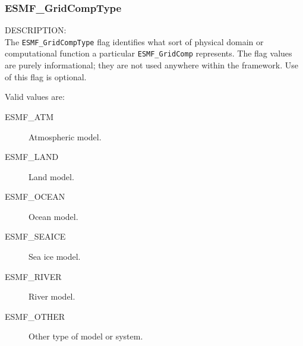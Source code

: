 
\subsubsection{ESMF\_GridCompType}
\label{opt:gridcomptype}

{\sf DESCRIPTION:\\}
The {\tt ESMF\_GridCompType} flag identifies what sort of physical domain
or computational function a particular {\tt ESMF\_GridComp} represents.
The flag values are purely informational; they are not used anywhere 
within the framework.  Use of this flag is optional.

Valid values are:
\begin{description}
   \item [ESMF\_ATM] 
         Atmospheric model.
   \item [ESMF\_LAND]
         Land model.
   \item [ESMF\_OCEAN] 
         Ocean model.
   \item [ESMF\_SEAICE]
         Sea ice model.
   \item [ESMF\_RIVER] 
         River model.
   \item [ESMF\_OTHER]
         Other type of model or system.
\end{description}
